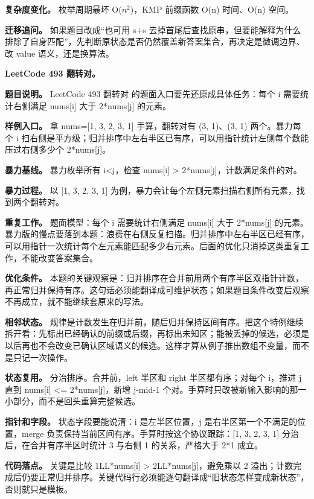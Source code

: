 \textbf{复杂度变化。} 枚举周期最坏 O(\ensuremath{n^{2}})，KMP 前缀函数 O(n) 时间、O(n) 空间。

\textbf{迁移追问。} 如果题目改成“也可用 s+s 去掉首尾后查找原串，但要能解释为什么排除了自身匹配”，先判断原状态是否仍然覆盖新答案集合，再决定是微调边界、改 value 语义，还是换算法。

\noindent\textbf{LeetCode 493 翻转对。}

\textbf{题目说明。} LeetCode 493 翻转对 的题面入口要先还原成具体任务：每个 i 需要统计右侧满足 nums[i] 大于 2*nums[j] 的元素。

\textbf{样例入口。} 拿 nums=[1, 3, 2, 3, 1] 手算，翻转对有 (3, 1)、(3, 1) 两个。暴力每个 i 扫右侧是平方级；归并排序中左右半区已有序，可以用指针统计左侧每个数能压过右侧多少个 2*nums[j]。

\textbf{暴力基线。} 暴力枚举所有 i<j，检查 nums[i] > 2*nums[j]，计数满足条件的对。

\textbf{暴力过程。} 以 [1, 3, 2, 3, 1] 为例，暴力会让每个左侧元素扫描右侧所有元素，找到两个翻转对。

\textbf{重复工作。} 题面模型：每个 i 需要统计右侧满足 nums[i] 大于 2*nums[j] 的元素。暴力版的慢点要落到本题：浪费在右侧反复扫描。归并排序中左右半区已经有序，可以用指针一次统计每个左元素能匹配多少右元素。后面的优化只消掉这类重复工作，不能改变答案集合。

\textbf{优化条件。} 本题的关键观察是：归并排序在合并前用两个有序半区双指针计数，再正常归并保持有序。这句话必须能翻译成可维护状态；如果题目条件改变后观察不再成立，就不能继续套原来的写法。

\textbf{相邻状态。} 规律是计数发生在归并前，随后归并保持区间有序。把这个特例继续拆开看：先标出已经确认的前缀或后缀，再标出未知区；能被丢掉的候选，必须是以后再也不会改变已确认区域语义的候选。这样才算从例子推出数组不变量，而不是只记一次操作。

\textbf{状态复用。} 分治排序。合并前，left 半区和 right 半区都有序；对每个 i，推进 j 直到 nums[i] <= 2*nums[j]，新增 j-mid-1 个对。手算时只改被新输入影响的那一小部分，而不是回头重算完整候选。

\textbf{指针和字段。} 状态字段要能说清：i 是左半区位置，j 是右半区第一个不满足的位置，merge 负责保持当前区间有序。手算时按这个协议跟踪：[1, 3, 2, 3, 1] 分治后，在合并有序半区时统计 3 与右侧 1 的关系，严格大于 2*1 成立。

\textbf{代码落点。} 关键是比较 1LL*nums[i] > 2LL*nums[j]，避免乘以 2 溢出；计数完成后仍要正常归并排序。关键代码行必须能逐句翻译成“旧状态怎样变成新状态”，否则就只是模板。

